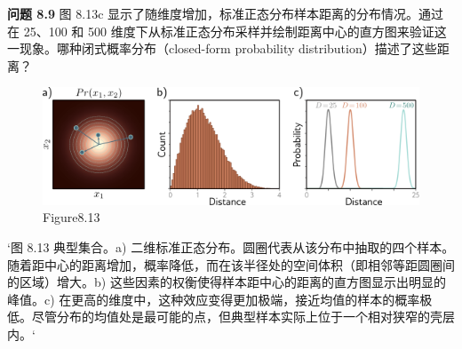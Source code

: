 \textbf{问题 8.9} 图 8.13c 显示了随维度增加，标准正态分布样本距离的分布情况。通过在 25、100 和 500 维度下从标准正态分布采样并绘制距离中心的直方图来验证这一现象。哪种闭式概率分布（closed-form probability distribution）描述了这些距离？

\begin{figure}[h!]
\centering
\includegraphics[width=0.7\linewidth]{png/chapter8/PerfTypical.png}
\caption{Figure8.13}
\end{figure}

`图 8.13 典型集合。a) 二维标准正态分布。圆圈代表从该分布中抽取的四个样本。随着距中心的距离增加，概率降低，而在该半径处的空间体积（即相邻等距圆圈间的区域）增大。b) 这些因素的权衡使得样本距中心的距离的直方图显示出明显的峰值。c) 在更高的维度中，这种效应变得更加极端，接近均值的样本的概率极低。尽管分布的均值处是最可能的点，但典型样本实际上位于一个相对狭窄的壳层内。`